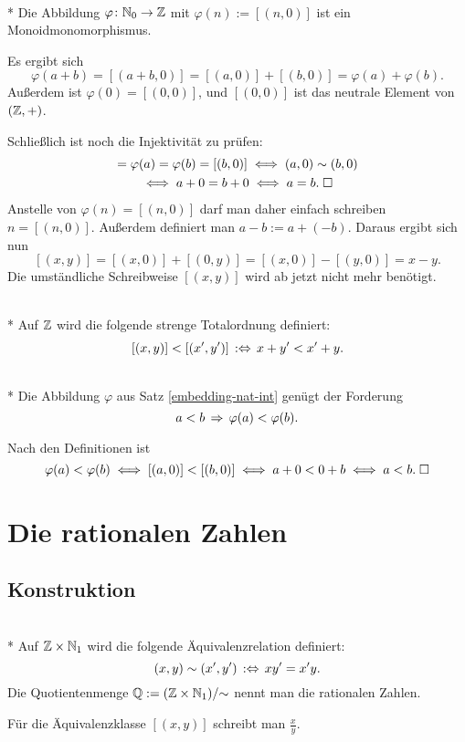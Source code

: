 \begin{Satz}%
\label{embedding-nat-int}\mbox{}\\*
Die Abbildung $\varphi\colon\mathbb N_0\to\mathbb Z$ mit $\varphi(n):=[(n,0)]$
ist ein Monoidmonomorphismus.
\end{Satz}
 Es ergibt sich
\[\varphi(a+b) = [(a+b,0)] = [(a,0)]+[(b,0)] = \varphi(a)+\varphi(b).\]
Außerdem ist $\varphi(0)=[(0,0)]$, und $[(0,0)]$
ist das neutrale Element von $(\mathbb Z,+)$.

Schließlich ist noch die Injektivität zu prüfen:
\begin{gather*}
[(a,0)] = \varphi(a) = \varphi(b)  = [(b,0)]\iff (a,0)\sim (b,0)\\
\iff a+0 = b+0 \iff a=b.\;\qedsymbol
\end{gather*}
Anstelle von $\varphi(n)=[(n,0)]$ darf man daher einfach schreiben
$n=[(n,0)]$. Außerdem definiert man $a-b:=a+(-b)$. Daraus
ergibt sich nun
\[[(x,y)] = [(x,0)]+[(0,y)] = [(x,0)] - [(y,0)] = x-y.\]
Die umständliche Schreibweise $[(x,y)]$ wird ab jetzt nicht
mehr benötigt.

\begin{Definition}\mbox{}\\*
Auf $\mathbb Z$ wird die folgende strenge Totalordnung definiert:
\[[(x,y)] < [(x',y')]\,:\Leftrightarrow\, x+y'<x'+y.\]
\end{Definition}

\begin{Satz}\mbox{}\\*
Die Abbildung $\varphi$ aus Satz \ref{embedding-nat-int}
genügt der Forderung
\[a<b\,\Rightarrow\, \varphi(a)<\varphi(b).\]
\end{Satz}
 Nach den Definitionen ist
\[\varphi(a)<\varphi(b)\iff [(a,0)]<[(b,0)]\iff a+0<0+b\iff a<b.\;\Box\]


\section{Die rationalen Zahlen}

\subsection{Konstruktion}

\begin{Definition}\mbox{}\\*
Auf $\mathbb Z\times\mathbb N_1$ wird die folgende Äquivalenzrelation definiert:
\[(x,y)\sim (x',y')\,:\Leftrightarrow\, xy' = x'y.\]
Die Quotientenmenge $\mathbb Q := (\mathbb Z\times\mathbb N_1)/{\sim}$ nennt man
die rationalen Zahlen.
\end{Definition}
Für die Äquivalenzklasse $[(x,y)]$ schreibt man $\frac{x}{y}$.

